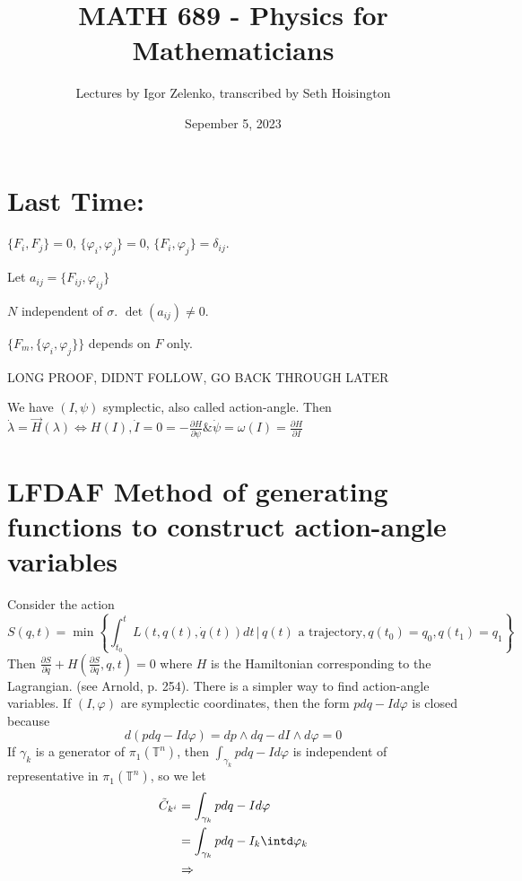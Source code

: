 \documentclass{article}
\title{MATH 689 - Physics for Mathematicians}
\author{Lectures by Igor Zelenko, transcribed by Seth Hoisington}
\date{Sepember 5, 2023}
\newcommand{\nl}{\newline\newline\noindent}
\newcommand{\vhi}{\varphi}
\newcommand{\w}{\omega}
\newcommand{\pdof}[2]{\frac{\partial #1}{\partial #2}}
\begin{document}
\maketitle
\section*{Last Time:}
$\{F_i,F_j\} = 0$, $\{\vhi_i,\vhi_j\} = 0$, $\{F_i,\vhi_j\} = \delta_{ij}$.

Let $a_{ij} = \{F_{ij},\vhi_{ij}\}$

$N$ independent of $\sigma$. $\det(a_{ij}) \neq 0$.

$\{F_m, \{\vhi_i,\vhi_j\}\}$ depends on $F$ only.


LONG PROOF, DIDNT FOLLOW, GO BACK THROUGH LATER

We have $(I,\psi)$ symplectic, also called action-angle. Then $\dot\lambda = \vec H(\lambda)\Leftrightarrow H(I), \dot I = 0 = -\pdof{H}{\psi} \& \dot\psi = \w(I) = \pdof{H}{I}$
\section*{LFDAF Method of generating functions to construct action-angle variables}
Consider the action
\[S(q,t) = \min\left\{\int_{t_0}^tL(t,q(t),\dot q(t))dt\,\big|\,\text{$q(t)$ a trajectory}, q(t_0) = q_0,q(t_1) = q_1\right\}\]
Then $\pdof{S}{q} + H\left(\pdof{S}{q},q,t\right) = 0$ where $H$ is the Hamiltonian corresponding to the Lagrangian. (see Arnold, p. 254).
\nl
There is a simpler way to find action-angle variables. If $(I,\vhi)$ are symplectic coordinates, then the form $pdq - Id\vhi$ is closed because 
\[d(pdq - Id\vhi) = dp\wedge dq - dI\wedge d\vhi = 0\]
If $\gamma_k$ is a generator of $\pi_1(\mathbb{T}^n)$, then
$\int_{\gamma_k}pdq - Id\vhi$ is independent of representative in $\pi_1(\mathbb{T}^n)$, so we let
\begin{align*}
    \tilde C_{k^i} &= \int_{\gamma_k}pdq - Id\vhi\\
    &=\int_{\gamma_k}pdq - I_k\intd\vhi_k\\
    &\Rightarrow
\end{align*}
\end{document}
